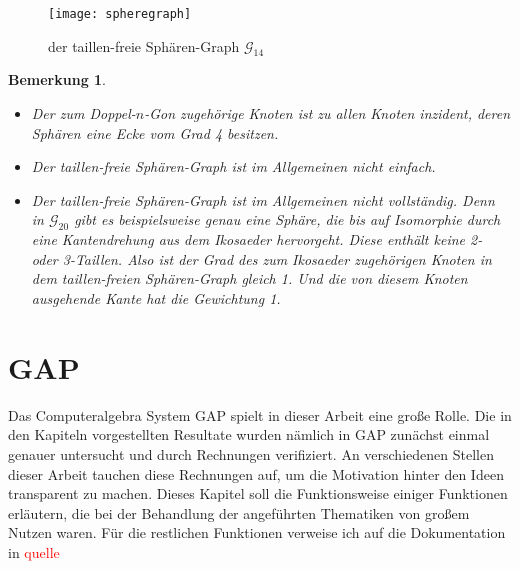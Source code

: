 \documentclass[12pt,titlepage,twoside,cleardoublepage]{article}
\theoremstyle{nummermitklammern}
\newtheorem{bemerkung}[temp]{Bemerkung}
\newtheorem{bemerkung}[zahl]{Bemerkung}
\numberwithin{equation}{section}
\begin{document}
 \begin{figure}[H]
\begin{center}
\texttt{[image: spheregraph]}
\end{center}
\caption{der taillen-freie Sphären-Graph $\mathcal{G}_{14}$}
\end{figure}
 \begin{bemerkung}
 \begin{itemize}
 \item Der zum Doppel-$n$-Gon zugehörige Knoten ist zu allen Knoten inzident, deren Sphären eine Ecke vom Grad 4 besitzen.
 \item Der taillen-freie Sphären-Graph ist im Allgemeinen nicht einfach.
 \item Der taillen-freie Sphären-Graph ist im Allgemeinen nicht vollständig. Denn in $\mathcal{G}_{20}$ gibt es beispielsweise genau eine Sphäre, die bis auf Isomorphie durch eine Kantendrehung aus dem Ikosaeder hervorgeht. Diese enthält keine 2- oder 3-Taillen. Also ist der Grad des zum Ikosaeder zugehörigen Knoten in dem taillen-freien Sphären-Graph gleich 1. Und die von diesem Knoten ausgehende Kante hat die Gewichtung 1.
 \end{itemize}
 \end{bemerkung}

\section{GAP}
Das Computeralgebra System GAP spielt in dieser Arbeit eine große Rolle.
Die in den Kapiteln vorgestellten Resultate wurden nämlich in GAP zunächst einmal genauer untersucht und durch Rechnungen verifiziert.
An verschiedenen Stellen dieser Arbeit tauchen diese Rechnungen auf, um die Motivation hinter den Ideen transparent zu machen.
 Dieses Kapitel soll die Funktionsweise einiger Funktionen erläutern, die bei der Behandlung der angeführten Thematiken von großem Nutzen waren. Für die restlichen Funktionen verweise ich auf die Dokumentation in \textcolor{red}{quelle}
\end{document}
